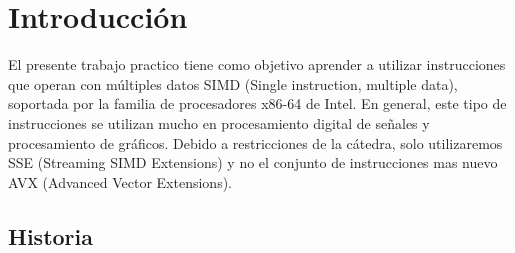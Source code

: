 \section{Introducción}

El presente trabajo practico tiene como objetivo aprender a utilizar instrucciones que operan con múltiples datos SIMD (Single instruction, multiple data), soportada por la familia de procesadores x86-64 de Intel. En general, este tipo de instrucciones se utilizan mucho en procesamiento digital de señales y procesamiento de gráficos. Debido a restricciones de la cátedra, solo utilizaremos SSE (Streaming SIMD Extensions) y no el conjunto de instrucciones mas nuevo AVX (Advanced Vector Extensions).
 
\subsection{Historia}
 
